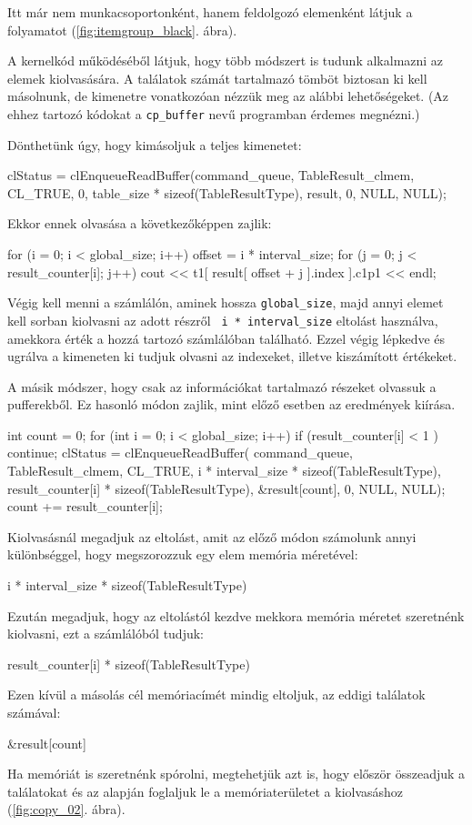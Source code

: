 Itt már nem munkacsoportonként, hanem feldolgozó elemenként látjuk a folyamatot (\ref{fig:itemgroup_black}. ábra).


A kernelkód működéséből látjuk, hogy több módszert is tudunk alkalmazni az elemek kiolvasására. A találatok számát tartalmazó tömböt biztosan ki kell másolnunk, de kimenetre vonatkozóan nézzük meg az alábbi lehetőségeket. (Az ehhez tartozó kódokat a \texttt{cp\_buffer} nevű programban érdemes megnézni.)


Dönthetünk úgy, hogy kimásoljuk a teljes kimenetet:
\begin{python}
clStatus = clEnqueueReadBuffer(command_queue, TableResult_clmem, 
    CL_TRUE, 0, table_size * sizeof(TableResultType), result, 
    0, NULL, NULL);
\end{python}
Ekkor ennek olvasása a következőképpen zajlik:
\begin{python}
for (i = 0; i < global_size; i++)
{
    offset = i * interval_size;
    for (j = 0; j < result_counter[i]; j++)
        cout << t1[ result[ offset + j ].index ].c1p1 << endl;
}
\end{python}
Végig kell menni a számlálón, aminek hossza \texttt{global\_size}, majd annyi elemet kell sorban kiolvasni az adott részről \texttt{ i * interval\_size} eltolást használva, amekkora érték a hozzá tartozó számlálóban található. Ezzel végig lépkedve és ugrálva a kimeneten ki tudjuk olvasni az indexeket, illetve kiszámított értékeket.


A másik módszer, hogy csak az információkat tartalmazó részeket olvassuk a pufferekből. Ez hasonló módon zajlik, mint előző esetben az eredmények kiírása.
\begin{python}
int count = 0;
for (int i = 0; i < global_size; i++)
{
    if (result_counter[i] < 1 ) continue; 
    clStatus = clEnqueueReadBuffer(
    command_queue, TableResult_clmem, CL_TRUE, 
	i * interval_size * sizeof(TableResultType),
	result_counter[i] * sizeof(TableResultType), 
	&result[count], 0, NULL, NULL);
	count += result_counter[i];
}
\end{python}

Kiolvasásnál megadjuk az eltolást, amit az előző módon számolunk annyi különbséggel, hogy megszorozzuk egy elem memória méretével:
\begin{python}
i * interval_size * sizeof(TableResultType)
\end{python}
Ezután megadjuk, hogy az eltolástól kezdve mekkora memória méretet szeretnénk kiolvasni, ezt a számlálóból tudjuk: 
\begin{python}
result_counter[i] * sizeof(TableResultType)
\end{python}
Ezen kívül a másolás cél memóriacímét mindig eltoljuk, az eddigi találatok számával:
\begin{python}
&result[count]
\end{python}
Ha memóriát is szeretnénk spórolni, megtehetjük azt is, hogy először összeadjuk a találatokat és az alapján foglaljuk le a memóriaterületet a kiolvasáshoz (\ref{fig:copy_02}. ábra).


